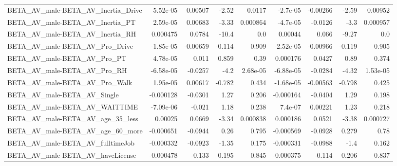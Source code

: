\begin{tabular}{lrrrrrrrr}
BETA\_AV\_male-BETA\_AV\_Inertia\_Drive                 &    5.52e-05 &      0.00507 &    -2.52 &   0.0117 &   -2.7e-05 &    -0.00266 &        -2.59 &       0.00952 \\
BETA\_AV\_male-BETA\_AV\_Inertia\_PT                    &    2.59e-05 &      0.00683 &    -3.33 & 0.000864 &   -4.7e-05 &     -0.0126 &         -3.3 &      0.000957 \\
BETA\_AV\_male-BETA\_AV\_Inertia\_RH                    &    0.000475 &       0.0784 &    -10.4 &      0.0 &    0.00044 &       0.066 &        -9.27 &           0.0 \\
BETA\_AV\_male-BETA\_AV\_Pro\_Drive                     &   -1.85e-05 &     -0.00659 &   -0.114 &    0.909 &  -2.52e-05 &    -0.00966 &       -0.119 &         0.905 \\
BETA\_AV\_male-BETA\_AV\_Pro\_PT                        &    4.78e-05 &        0.011 &    0.859 &     0.39 &   0.000176 &      0.0427 &         0.89 &         0.374 \\
BETA\_AV\_male-BETA\_AV\_Pro\_RH                        &   -6.58e-05 &      -0.0257 &     -4.2 & 2.68e-05 &  -6.88e-05 &     -0.0284 &        -4.32 &      1.53e-05 \\
BETA\_AV\_male-BETA\_AV\_Pro\_Walk                      &    1.95e-05 &      0.00617 &   -0.782 &    0.434 &  -1.68e-05 &    -0.00563 &       -0.798 &         0.425 \\
BETA\_AV\_male-BETA\_AV\_Single                        &   -0.000128 &      -0.0301 &     1.27 &    0.206 &  -0.000164 &     -0.0404 &         1.29 &         0.198 \\
BETA\_AV\_male-BETA\_AV\_WAITTIME                      &   -7.09e-06 &       -0.021 &     1.18 &    0.238 &    7.4e-07 &     0.00221 &         1.23 &         0.218 \\
BETA\_AV\_male-BETA\_AV\_age\_35\_less                   &     0.00025 &       0.0669 &    -3.34 & 0.000838 &   0.000186 &      0.0521 &        -3.38 &      0.000727 \\
BETA\_AV\_male-BETA\_AV\_age\_60\_more                   &   -0.000651 &      -0.0944 &     0.26 &    0.795 &  -0.000569 &     -0.0928 &        0.279 &          0.78 \\
BETA\_AV\_male-BETA\_AV\_fulltimeJob                   &   -0.000332 &      -0.0923 &    -1.35 &    0.175 &  -0.000331 &     -0.0988 &         -1.4 &         0.162 \\
BETA\_AV\_male-BETA\_AV\_haveLicense                   &   -0.000478 &       -0.133 &    0.195 &    0.845 &  -0.000375 &      -0.114 &        0.206 &         0.837 \\

\end{tabular}
